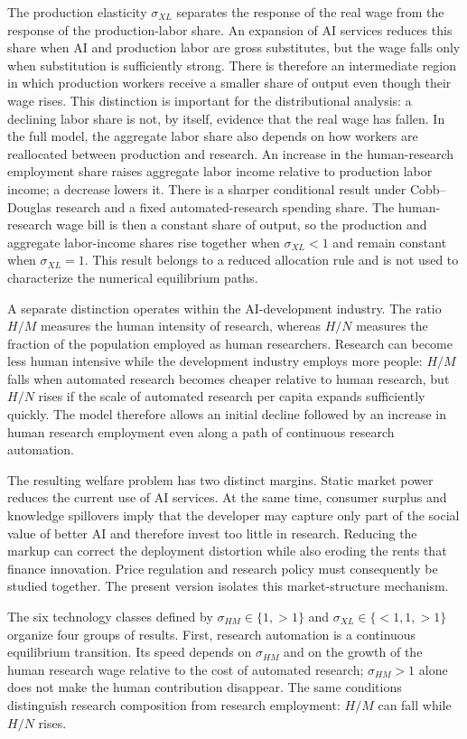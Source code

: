 The production elasticity $\sigma_{XL}$ separates the response of the real wage from the
response of the production-labor share. An expansion of AI services reduces this share when AI and
production labor are gross substitutes, but the wage falls only when substitution is
sufficiently strong. There is therefore an intermediate region in which production
workers receive a smaller share of output even though their wage rises. This
distinction is important for the distributional analysis: a declining labor share is
not, by itself, evidence that the real wage has fallen. In the full model, the
aggregate labor share also depends on how workers are reallocated between production
and research. An increase in the human-research employment share raises aggregate
labor income relative to production labor income; a decrease lowers it.
There is a sharper conditional result under Cobb--Douglas research and a fixed
automated-research spending share. The human-research wage bill is then a constant
share of output, so the production and aggregate labor-income shares rise together
when $\sigma_{XL}<1$ and remain constant when $\sigma_{XL}=1$. This result belongs
to a reduced allocation rule and is not used to characterize the numerical
equilibrium paths.

A separate distinction operates within the AI-development industry. The ratio
$H/M$ measures the human intensity of research, whereas $H/N$ measures the fraction
of the population employed as human researchers. Research can become less human
intensive while the development industry employs more people: $H/M$ falls when
automated research becomes cheaper relative to human research, but $H/N$ rises if
the scale of automated research per capita expands sufficiently quickly. The model
therefore allows an initial decline followed by an increase in human research
employment even along a path of continuous research automation.

The resulting welfare problem has two distinct margins. Static market power reduces
the current use of AI services. At the same time, consumer surplus and knowledge
spillovers imply that the developer may capture only part of the social value of
better AI and therefore invest too little in research. Reducing the markup can
correct the deployment distortion while also eroding the rents that finance
innovation. Price regulation and research policy must consequently be studied
together. The present version isolates this market-structure mechanism.

The six technology classes defined by $\sigma_{HM}\in\{1,>1\}$ and
$\sigma_{XL}\in\{<1,1,>1\}$ organize four groups of results. First, research automation is a
continuous equilibrium transition. Its speed depends on $\sigma_{HM}$ and on the
growth of the human research wage relative to the cost of automated research;
$\sigma_{HM}>1$ alone does not make the human contribution disappear. The same
conditions distinguish research composition from research employment: $H/M$ can
fall while $H/N$ rises.

